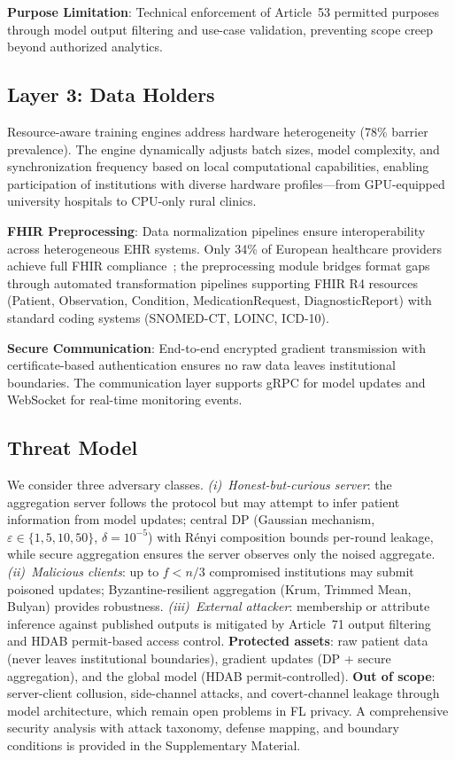 \documentclass[conference,a4paper]{IEEEtran}
\begin{document}
\textbf{Purpose Limitation}: Technical enforcement of Article~53 permitted purposes through model output filtering and use-case validation, preventing scope creep beyond authorized analytics.

\subsection{Layer 3: Data Holders}

Resource-aware training engines address hardware heterogeneity (78\% barrier prevalence). The engine dynamically adjusts batch sizes, model complexity, and synchronization frequency based on local computational capabilities, enabling participation of institutions with diverse hardware profiles---from GPU-equipped university hospitals to CPU-only rural clinics.

\textbf{FHIR Preprocessing}: Data normalization pipelines ensure interoperability across heterogeneous EHR systems. Only 34\% of European healthcare providers achieve full FHIR compliance~\cite{hussein2025interop}; the preprocessing module bridges format gaps through automated transformation pipelines supporting FHIR R4 resources (Patient, Observation, Condition, MedicationRequest, DiagnosticReport) with standard coding systems (SNOMED-CT, LOINC, ICD-10).

\textbf{Secure Communication}: End-to-end encrypted gradient transmission with certificate-based authentication ensures no raw data leaves institutional boundaries. The communication layer supports gRPC for model updates and WebSocket for real-time monitoring events.

\subsection{Threat Model}

We consider three adversary classes. \textit{(i)~Honest-but-curious server}: the aggregation server follows the protocol but may attempt to infer patient information from model updates; central DP (Gaussian mechanism, $\varepsilon \in \{1{,}5{,}10{,}50\}$, $\delta{=}10^{-5}$) with R\'{e}nyi composition bounds per-round leakage, while secure aggregation ensures the server observes only the noised aggregate. \textit{(ii)~Malicious clients}: up to $f < n/3$ compromised institutions may submit poisoned updates; Byzantine-resilient aggregation (Krum, Trimmed Mean, Bulyan) provides robustness. \textit{(iii)~External attacker}: membership or attribute inference against published outputs is mitigated by Article~71 output filtering and HDAB permit-based access control. \textbf{Protected assets}: raw patient data (never leaves institutional boundaries), gradient updates (DP + secure aggregation), and the global model (HDAB permit-controlled). \textbf{Out of scope}: server-client collusion, side-channel attacks, and covert-channel leakage through model architecture, which remain open problems in FL privacy. A comprehensive security analysis with attack taxonomy, defense mapping, and boundary conditions is provided in the Supplementary Material.
\end{document}
